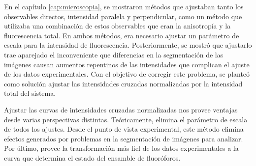 




En el capítulo \ref{cap:microscopia}, se mostraron métodos que ajustaban tanto los observables directos, intensidad paralela y perpendicular, como un método que utilizaba una combinación de estos observables que eran la anisotropía y la fluorescencia total. En ambos métodos, era necesario ajustar un parámetro de escala para la intensidad de fluorescencia. Posteriormente, se mostró que ajustarlo trae aparejado el inconveniente que diferencias en la segmentación de las imágenes causan aumentos repentinos de las intensidades que complican el ajuste de los datos experimentales. Con el objetivo de corregir este problema, se planteó como solución ajustar las intensidades cruzadas normalizadas por la intensidad total del sistema.

Ajustar las curvas de intensidades cruzadas normalizadas nos provee ventajas desde varias perspectivas distintas. Teóricamente, elimina el parámetro de escala de todos los ajustes. Desde el punto de vista experimental, este método elimina efectos generados por problemas en la segmentación de imágenes para analizar. Por último, provee la transformación más fiel de los datos experimentales a la curva que determina el estado del ensamble de fluoróforos.


